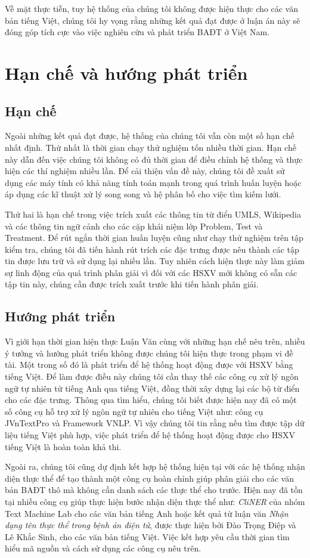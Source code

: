Về mặt thực tiễn, tuy hệ thống của chúng tôi không được hiện thực cho các văn bản tiếng Việt, chúng tôi hy vọng rằng những kết quả đạt được ở luận án này sẽ đóng góp tích cực vào việc nghiên cứu và phát triển BAĐT ở Việt Nam.

\section{Hạn chế và hướng phát triển}
\subsection*{Hạn chế}
Ngoài những kết quả đạt được, hệ thống của chúng tôi vẫn còn một số hạn chế nhất định. Thứ nhất là thời gian chạy thử nghiệm tốn nhiều thời gian. Hạn chế này dẫn đến việc chúng tôi không có đủ thời gian để điều chỉnh hệ thống và thực hiện các thí nghiệm nhiều lần. Để cải thiện vấn đề này, chúng tôi đề xuất sử dụng các máy tính có khả năng tính toán mạnh trong quá trình huấn luyện hoặc áp dụng các kĩ thuật xử lý song song và hệ phân bố cho việc tìm kiếm lưới.

Thứ hai là hạn chế trong việc trích xuất các thông tin từ điển UMLS, Wikipedia và các thông tin ngữ cảnh cho các cặp khái niệm lớp Problem, Test và Treatment. Để rút ngắn thời gian huấn luyện cũng như chạy thử nghiệm trên tập kiểm tra, chúng tôi đã tiến hành rút trích các đặc trưng được nêu thành các tập tin được lưu trữ và sử dụng lại nhiều lần. Tuy nhiên cách hiện thực này làm giảm sự linh động của quá trình phân giải vì đối với các HSXV mới không có sẵn các tập tin này, chúng cần được trích xuất trước khi tiến hành phân giải.

\subsection*{Hướng phát triển}
Vì giới hạn thời gian hiện thực Luận Văn cùng với những hạn chế nêu trên, nhiều ý tưởng và hướng phát triển không được chúng tôi hiện thực trong phạm vi đề tài. Một trong số đó là phát triển để hệ thống hoạt động được với HSXV bằng tiếng Việt. Để làm được điều này chúng tôi cần thay thế các công cụ xử lý ngôn ngữ tự nhiên từ tiếng Anh qua tiếng Việt, đồng thời xây dựng lại các bộ từ điển cho các đặc trưng. Thông qua tìm hiểu, chúng tôi biết được hiện nay đã có một số công cụ hỗ trợ xử lý ngôn ngữ tự nhiên cho tiếng Việt như: công cụ JVnTextPro và Framework VNLP. Vì vậy chúng tôi tin rằng nếu tìm được tập dữ liệu tiếng Việt phù hợp, việc phát triển để hệ thống hoạt động được cho HSXV tiếng Việt là hoàn toàn khả thi.

Ngoài ra, chúng tôi cũng dự định kết hợp hệ thống hiện tại với các hệ thống nhận diện thực thể để tạo thành một công cụ hoàn chỉnh giúp phân giải cho các văn bản BAĐT thô mà không cần danh sách các thực thể cho trước. Hiện nay đã tồn tại nhiều công cụ giúp thực hiện bước nhận diện thực thể như: \textit{CliNER} của nhóm Text Machine Lab cho các văn bản tiếng Anh hoặc kết quả từ luận văn \textit{Nhận dạng tên thực thể trong bệnh án điện tử}, được thực hiện bởi Đào Trọng Điệp và Lê Khắc Sinh, cho các văn bản tiếng Việt. Việc kết hợp yêu cầu thời gian tìm hiểu mã nguồn và cách sử dụng các công cụ nêu trên.
